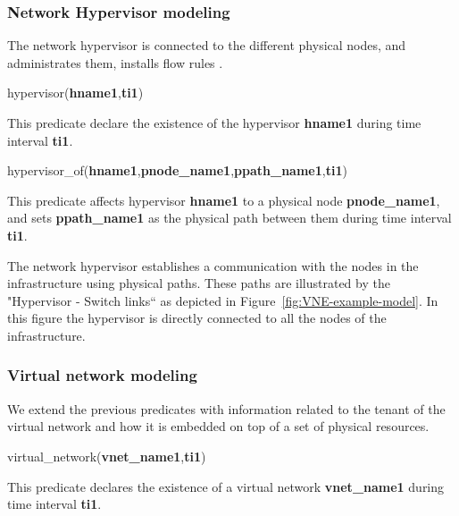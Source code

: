 







\subsubsection{Network Hypervisor modeling}
The network hypervisor is connected to the different physical nodes, and administrates them, installs flow rules \etc.


hypervisor(\textbf{hname1},\textbf{ti1})

This predicate declare the existence of the hypervisor \textbf{hname1} during time interval \textbf{ti1}.

hypervisor\_of(\textbf{hname1},\textbf{pnode\_name1},\textbf{ppath\_name1},\textbf{ti1})

This predicate affects hypervisor \textbf{hname1} to a physical node \textbf{pnode\_name1}, and sets \textbf{ppath\_name1} as the physical path between them during time interval \textbf{ti1}.

The network hypervisor establishes a communication with the nodes in the infrastructure using physical paths.
These paths are illustrated by the "Hypervisor - Switch links`` as depicted in Figure~\ref{fig:VNE-example-model}.
In this figure the hypervisor is directly connected to all the nodes of the infrastructure.



\subsubsection{Virtual network modeling}
We extend the previous predicates with information related to the tenant of the virtual network and how it is embedded on top of a set of physical resources.

virtual\_network(\textbf{vnet\_name1},\textbf{ti1})

This predicate declares the existence of a virtual network \textbf{vnet\_name1} during time interval \textbf{ti1}.

